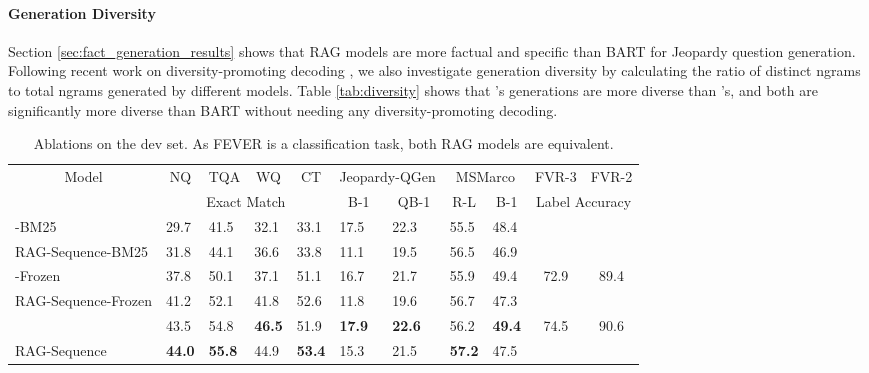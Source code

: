 \paragraph{Generation Diversity} Section \ref{sec:fact_generation_results} shows that RAG models are more factual and specific than BART for Jeopardy question generation. Following recent work on diversity-promoting decoding  \cite{li-etal-2016-diversity,Vijayakumar2016DiverseBS,massarelli2019decoding}, we also investigate generation diversity by calculating the ratio of distinct ngrams to total ngrams generated by different models. Table \ref{tab:diversity} shows that \raganswer{}'s generations are more diverse than \ragtoken{}'s, and both are significantly more diverse than BART
without needing any diversity-promoting decoding.
\begin{table}[t]

    \centering
    \small
        \caption{Ablations on the dev set. As FEVER is a classification task, both RAG models are equivalent.}
        \vspace{5pt}
    \begin{tabular}{lllll|llll|cc}
    \toprule
         \multicolumn{1}{c}{Model} & \multicolumn{1}{c}{NQ} & \multicolumn{1}{c}{TQA} & \multicolumn{1}{c}{WQ} & \multicolumn{1}{c}{CT} & \multicolumn{2}{c}{Jeopardy-QGen} & \multicolumn{2}{c}{MSMarco} & \multicolumn{1}{c}{FVR-3} & \multicolumn{1}{c}{FVR-2} \\
         \multicolumn{1}{c}{} & \multicolumn{4}{c}{Exact Match} &   \multicolumn{1}{c}{B-1} & \multicolumn{1}{c}{QB-1} &\multicolumn{1}{c}{R-L} & \multicolumn{1}{c}{B-1} & \multicolumn{2}{c}{Label Accuracy} \\
         \midrule
        \ragtoken{}-BM25 & 29.7&	41.5&	32.1&	33.1 & 17.5 &	22.3&	55.5 &	48.4 & \textbf{\multirow{ 2}{*}{75.1}} & \textbf{\multirow{ 2}{*}{91.6}}\\
        RAG-Sequence-BM25 & 31.8&	44.1&	36.6&	33.8 & 11.1	& 19.5	&56.5 &	46.9 \\
        \midrule
        \ragtoken{}-Frozen & 37.8 &	50.1 &	37.1&	51.1 & 16.7	&21.7&	55.9 &	49.4 & \multirow{ 2}{*}{72.9} & \multirow{ 2}{*}{89.4} \\
        RAG-Sequence-Frozen & 41.2	& 52.1&	41.8&	52.6 & 11.8	& 19.6&	56.7 &	47.3 \\
        \midrule
        \ragtoken{} & 43.5&	54.8&	\textbf{46.5}&	51.9 & \textbf{17.9}	& \textbf{22.6} &	56.2&	\textbf{49.4}& \multirow{ 2}{*}{74.5} & \multirow{2}{*}{90.6}\\
        RAG-Sequence & \textbf{44.0}&	\textbf{55.8}&	44.9 &	\textbf{53.4} & 15.3&	21.5 &	\textbf{57.2} &	47.5\\
    \bottomrule
    \end{tabular}

    \label{tab:ablations}
\end{table}
